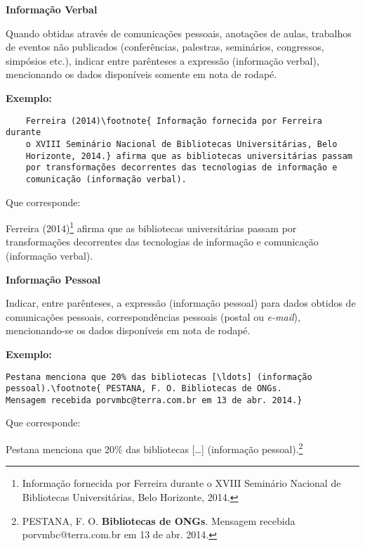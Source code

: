\textbf{Informação Verbal}

Quando obtidas através de comunicações pessoais, anotações de aulas, trabalhos de eventos não publicados (conferências, palestras, seminários, congressos, simpósios etc.), indicar entre parênteses a expressão (informação verbal), mencionando os dados disponíveis somente em nota de rodapé.

\textbf{Exemplo:}

\begin{alineas}
	\item
	\begin{verbatim}
	Ferreira (2014)\footnote{ Informação fornecida por Ferreira durante 
	o XVIII Seminário Nacional de Bibliotecas Universitárias, Belo 
	Horizonte, 2014.} afirma que as bibliotecas universitárias passam 
	por transformações decorrentes das tecnologias de informação e 
	comunicação (informação verbal).
	\end{verbatim}
\end{alineas}

Que corresponde:

Ferreira (2014)\footnote{ Informação fornecida por Ferreira durante 
o XVIII Seminário Nacional de Bibliotecas Universitárias, Belo Horizonte, 
2014.} afirma que as bibliotecas universitárias passam por transformações decorrentes das tecnologias de informação e comunicação (informação verbal).


\textbf{Informação Pessoal}

Indicar, entre parênteses, a expressão (informação pessoal) para dados obtidos de comunicações pessoais, correspondências pessoais (postal ou \emph{e-mail}), mencionando-se os dados disponíveis em nota de rodapé.

\textbf{Exemplo:}


\begin{alineas}
\item
\begin{verbatim}
Pestana menciona que 20% das bibliotecas [\ldots] (informação 
pessoal).\footnote{ PESTANA, F. O. Bibliotecas de ONGs. 
Mensagem recebida porvmbc@terra.com.br em 13 de abr. 2014.}
\end{verbatim}
\end{alineas}


Que corresponde:

Pestana menciona que 20\% das bibliotecas [\ldots] (informação pessoal).\footnote{ PESTANA, F. O. \textbf{Bibliotecas de ONGs}. Mensagem recebida porvmbc@terra.com.br em 13 de abr. 2014.}\\


